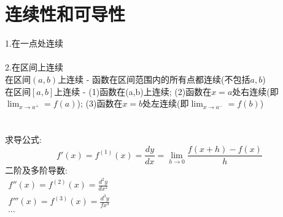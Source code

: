 \chapter{连续性和可导性}
1.在一点处连续\\[1ex]
\\[4ex]
2.在区间上连续\\
在区间$(a,b)$上连续 - 函数在区间范围内的所有点都连续(不包括$a,b$)\\
在区间$[a,b]$上连续 - (1)函数在(a,b)上连续; (2)函数在$x=a$处右连续(即$\displaystyle\lim_{x\to a^+}=f(a)$); (3)函数在$x=b$处左连续(即$\displaystyle\lim_{x\to a^-}=f(b)$)\\[4ex]
\\[4ex]
\\[4ex]
求导公式:
\[f'(x)=f^{(1)}(x)=\frac{dy}{dx}=\lim_{h\to 0}\frac{f(x+h)-f(x)}{h}\]
二阶及多阶导数:\\
\begin{math}
\begin{array}{l}
	\displaystyle f''(x)=f^{(2)}(x)=\frac{d^2y}{dx^2}\\[2ex]
	\displaystyle f'''(x)=f^{(3)}(x)=\frac{d^3y}{fx^3}\\[2ex]
	\cdots
\end{array}
\end{math}\\[2ex]
